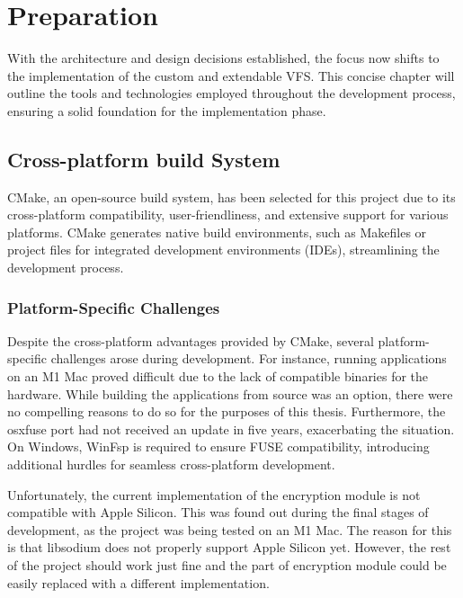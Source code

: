 \chapter{Preparation}
\label{chap:preparation}

With the architecture and design decisions established, the focus now shifts to the implementation of the custom and extendable VFS\@.
This concise chapter will outline the tools and technologies employed throughout the development process, ensuring a solid foundation for the implementation phase.


\section{Cross-platform build System}\label{sec:build-system-and-cross-platform-challenges}

CMake\cite{cmake}, an open-source build system, has been selected for this project due to its cross-platform compatibility, user-friendliness, and extensive support for various platforms.
CMake generates native build environments, such as Makefiles or project files for integrated development environments (IDEs), streamlining the development process.

\subsection{Platform-Specific Challenges}\label{subsec:platform-specific-challenges}

Despite the cross-platform advantages provided by CMake, several platform-specific challenges arose during development.
For instance, running applications on an M1 Mac proved difficult due to the lack of compatible binaries for the hardware.
While building the applications from source was an option, there were no compelling reasons to do so for the purposes of this thesis.
Furthermore, the osxfuse port had not received an update in five years, exacerbating the situation.
On Windows, WinFsp\cite{winfsp} is required to ensure FUSE compatibility, introducing additional hurdles for seamless cross-platform development.

Unfortunately, the current implementation of the encryption module is not compatible with Apple Silicon.
This was found out during the final stages of development, as the project was being tested on an M1 Mac.
The reason for this is that libsodium does not properly support Apple Silicon yet.
However, the rest of the project should work just fine and the part of encryption module could be easily replaced with a different implementation.


